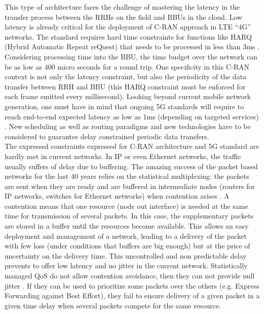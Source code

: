 \documentclass{article}
\begin{document}
 This type of architecture faces the challenge of mastering the latency in the transfer process between the RRHs on the field and BBUs in the cloud.
 Low latency is already critical for the deployment of C-RAN approach in LTE “4G” networks. 
 The standard requires hard time constraints for functions like HARQ (Hybrid Automatic Repeat reQuest) that needs to be processed in less than 3ms \cite{bouguen2012lte}. Considering processing time into the BBU, the time budget over the network can be as low as 400 micro seconds for a round trip. One specificity in this C-RAN context is not only the latency constraint, but also the periodicity of the data transfer between RRH and BBU (this HARQ constraint must be enforced for each frame emitted every millisecond).
 Looking beyond current mobile network generation, one must have in mind that ongoing 5G standards will require to reach end-to-end expected latency as low as 1ms (depending on targeted services) \cite{boccardi2014five}.
 New scheduling as well as routing paradigms and new technologies have to be considered to guarantee delay constrained periodic data transfers.\\

The expressed constraints expressed for C-RAN architecture and 5G standard are hardly met in current networks. In IP or even Ethernet networks, the traffic usually suffers of delay due to buffering. The amazing success of the packet based networks for the last 40 years relies on the statistical multiplexing: the packets are sent when they are ready and are buffered in intermediate nodes (routers for IP networks, switches for Ethernet networks) when contention arises \cite{venkatramani1994supporting}. A contention means that one resource (node out interface) is needed at the same time for transmission of several packets. In this case, the supplementary packets are stored in a buffer until the resources become available. This allows an easy deployment and management of a network, leading to a delivery of the packet with few loss (under conditions that buffers are big enough) but at the price of uncertainty on the delivery time. This uncontrolled and non predictable delay prevents to offer low latency and no jitter in the current network. 
Statistically managed QoS do not allow contention avoidance, then they can not provide null jitter \cite{khaunte2003technique}. If they can be used to prioritize some packets over the others (e.g. Express Forwarding against Best Effort), they fail to ensure delivery of a given packet in a given time delay when several packets compete for the same resource.\\ 
\end{document}
